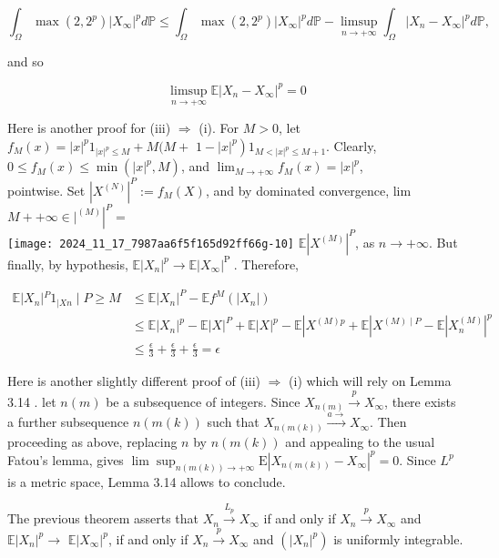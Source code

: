\documentclass[11pt]{amsbook}
\theoremstyle{plain}%
\theoremstyle{definition}
\theoremstyle{remark}
\begin{document}
$$
\int_{\Omega} \max \left(2,2^{p}\right)\left|X_{\infty}\right|^{p} d \mathbb{P} \leq \int_{\Omega} \max \left(2,2^{p}\right)\left|X_{\infty}\right|^{p} d \mathbb{P}-\limsup _{n \rightarrow+\infty} \int_{\Omega}\left|X_{n}-X_{\infty}\right|^{p} d \mathbb{P},
$$

and so

$$
\limsup _{n \rightarrow+\infty} \mathbb{E}\left|X_{n}-X_{\infty}\right|^{p}=0
$$

Here is another proof for (iii) $\Rightarrow$ (i). For $M>0$, let $f_{M}(x)=|x|^{p} 1_{|x|^{p} \leq M}+M(M+$ $\left.1-|x|^{p}\right) 1_{M<|x|^{p} \leq M+1}$. Clearly, $0 \leq f_{M}(x) \leq \min \left(|x|^{p}, M\right)$, and $\lim _{M \rightarrow+\infty} f_{M}(x)=|x|^{p}$,\\
pointwise. Set $\left|X^{(N)}\right|^{P}:=f_{M}(X)$, and by dominated convergence, lim $M++\left.\left.\infty \in\right|^{(M)}\right|^{P}=$\\
\texttt{[image: 2024\_11\_17\_7987aa6f5f165d92ff66g-10]} $\mathbb{E}\left|X^{(M)}\right|^{P}$, as $n \rightarrow+\infty$. But finally, by hypothesis, $\mathbb{E}\left|X_{n}\right|^{p} \rightarrow \mathbb{E}\left|X_{\infty}\right|^{\text {P }}$. Therefore,

$$
\begin{aligned}
\mathbb{E}\left|X_{n}\right|{ }^{P} 1_{\mid X n} \mid P \geq M & \leq \mathbb{E}\left|X_{n}\right|^{P}-\mathbb{E} f^{M}\left(\left|X_{n}\right|\right) \\
& \leq \mathbb{E}\left|X_{n}\right|^{p}-\mathbb{E}|X|^{P}+\mathbb{E}|X|^{p}-\mathbb{E}\left|X^{(M) p}+\mathbb{E}\right| X^{(M) \mid P}-\mathbb{E}\left|X_{n}^{(M)}\right|^{p} \\
& \leq \frac{\epsilon}{3}+\frac{\epsilon}{3}+\frac{\epsilon}{3}=\epsilon
\end{aligned}
$$

Here is another slightly different proof of (iii) $\Rightarrow$ (i) which will rely on Lemma 3.14 . let $n(m)$ be a subsequence of integers. Since $X_{n(m)} \xrightarrow{p} X_{\infty}$, there exists a further subsequence $n(m(k))$ such that $X_{n(m(k))} \xrightarrow{a \rightarrow} X_{\infty}$. Then proceeding as above, replacing $n$ by $n(m(k))$ and appealing to the usual Fatou's lemma, gives $\lim \sup _{n(m(k)) \rightarrow+\infty} \mathrm{E}\left|X_{n(m(k))}-X_{\infty}\right|^{p}=0$. Since $L^{p}$ is a metric space, Lemma 3.14 allows to conclude.

The previous theorem asserts that $X_{n} \xrightarrow{L_{p}} X_{\infty}$ if and only if $X_{n} \xrightarrow{p} X_{\infty}$ and $\mathbb{E}\left|X_{n}\right|^{p} \rightarrow$ $\mathbb{E}\left|X_{\infty}\right|^{p}$, if and only if $X_{n} \xrightarrow{p} X_{\infty}$ and $\left(\left|X_{n}\right|^{p}\right)$ is uniformly integrable.
\end{document}
